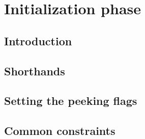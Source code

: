 
\section{Initialization phase         \lispDone{}}
\subsection{Introduction              \lispNone{}}   \label{hub: initialization phase: intro}                    
\subsection{Shorthands                \lispDone{}}   \label{hub: initialization phase: shorthands}               
\subsection{Setting the peeking flags \lispDone{}}   \label{hub: initialization phase: setting peeking flags}    
\subsection{Common constraints        \lispDone{}}   \label{hub: initialization phase: common constraints}       

